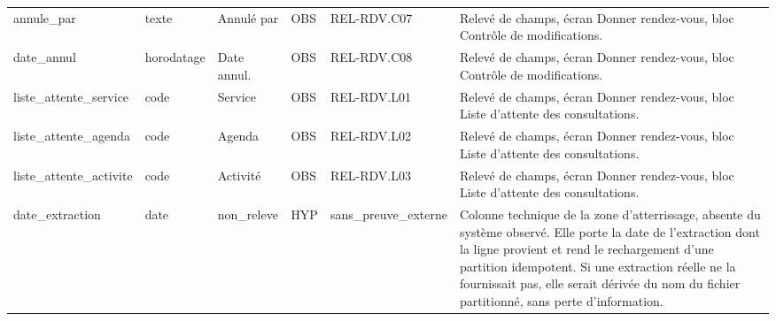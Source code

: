 \begin{longtable}{p{2.5cm}p{1.8cm}p{2.8cm}p{1.3cm}p{2.2cm}p{5cm}}
annule\_par & texte & Annulé par & OBS & REL-RDV.C07 & Relevé de champs, écran Donner rendez-vous, bloc Contrôle de modifications. \\
date\_annul & horodatage & Date annul. & OBS & REL-RDV.C08 & Relevé de champs, écran Donner rendez-vous, bloc Contrôle de modifications. \\
liste\_attente\_service & code & Service & OBS & REL-RDV.L01 & Relevé de champs, écran Donner rendez-vous, bloc Liste d'attente des consultations. \\
liste\_attente\_agenda & code & Agenda & OBS & REL-RDV.L02 & Relevé de champs, écran Donner rendez-vous, bloc Liste d'attente des consultations. \\
liste\_attente\_activite & code & Activité & OBS & REL-RDV.L03 & Relevé de champs, écran Donner rendez-vous, bloc Liste d'attente des consultations. \\
date\_extraction & date & non\_releve & HYP & sans\_preuve\_externe & Colonne technique de la zone d'atterrissage, absente du système observé. Elle porte la date de l'extraction dont la ligne provient et rend le rechargement d'une partition idempotent. Si une extraction réelle ne la fournissait pas, elle serait dérivée du nom du fichier partitionné, sans perte d'information. \\
\hline
\end{longtable}

